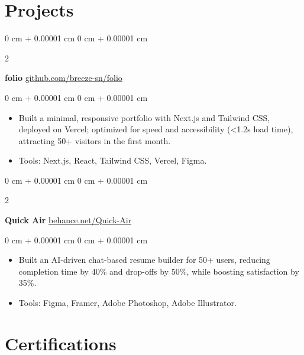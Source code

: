 \documentclass[10pt, letterpaper]{article}
\newenvironment{highlights}{
   \begin{itemize}[
        topsep=0.10 cm,
        parsep=0.10 cm,
        partopsep=0pt,
        itemsep=0pt
    ]
    \addtolength{\leftskip}{-0.5em} %
}{
    \end{itemize}
} %
\newenvironment{onecolentry}{
    \begin{adjustwidth}{
        0 cm + 0.00001 cm
    }{
        0 cm + 0.00001 cm
    }
}{
    \end{adjustwidth}
} %
\newenvironment{twocolentry}[2][]{
    \onecolentry
    \def\secondColumn{#2}
    \setcolumnwidth{\fill, 4.5 cm}
    \begin{paracol}{2}
}{
    \switchcolumn \raggedleft \secondColumn
    \end{paracol}
    \endonecolentry
} %
\begin{document}
    \section{\color{secondaryColor}Projects}
        
        \begin{twocolentry}{
            \href{https://github.com/breeze-sn/folio}{github.com/breeze-sn/folio}
        }
            \textbf{folio}\end{twocolentry}

        \vspace{0.10 cm}
        \begin{onecolentry}
            \begin{highlights}
                \item Built a minimal, responsive portfolio with Next.js and Tailwind CSS, deployed on Vercel; optimized for speed and accessibility (<1.2s load time), attracting 50+ visitors in the first month.  
                \item Tools: Next.js, React, Tailwind CSS, Vercel, Figma.
            \end{highlights}
        \end{onecolentry}

        \vspace{0.2 cm}
        
        \begin{twocolentry}{
            \href{https://www.behance.net/gallery/230187655/Quick-Air/modules/1319336525}{behance.net/Quick-Air}
        }
            \textbf{Quick Air}\end{twocolentry}

        \vspace{0.10 cm}
        \begin{onecolentry}
            \begin{highlights}
                \item Built an AI-driven chat-based resume builder for 50+ users, reducing completion time by 40\% and drop-offs by 50\%, while boosting satisfaction by 35\%. 
                 
                \item Tools: Figma, Framer, Adobe Photoshop, Adobe Illustrator.
            \end{highlights}
        \end{onecolentry}

        \section{\color{secondaryColor}Certifications}
\end{document}
